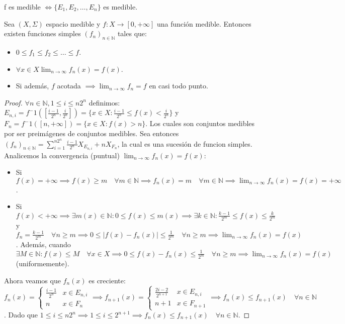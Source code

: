\begin{observación}
    f es medible $\iff \{E_1, E_2, \dots, E_n\}$ es medible.
\end{observación}
\begin{teorema}
    Sea $(X, \Sigma)$ espacio medible y $f: X \to [0, +\infty]$ una función medible. Entonces existen funciones simples $(f_n)_{n \in \mathbb{N}}$ tales que:
    \begin{itemize}
        \item $0 \leq f_1 \leq f_2 \leq \dots \leq f$.
        \item $\forall x \in X \lim_{n \to \infty}f_n(x) = f(x)$.
        \item Si además, $f$ acotada $\implies \lim_{n \to \infty}f_n = f$ en casi todo punto.
    \end{itemize} 
\end{teorema}
\begin{proof}
    $\forall n \in \mathbb{N}, 1 \leq i \leq n2^n$ definimos: 
    $E_{n, i} = f^-1([\frac{i-1}{2^n}, \frac{i}{2^n}]) = \{x \in X : \frac{i-1}{2^n} \leq f(x) < \frac{i}{2^n}\}$ y $F_n = f^-1([n, +\infty]) = \{x \in X : f(x) > n\}$.
    Los cuales son conjuntos medibles por ser preimágenes de conjuntos medibles. Sea entonces $(f_n)_{n\in\mathbb{N}} = \sum_{i = 1}^{n2^n}\frac{i-1}{2^n}X_{E_{n, i}} + nX_{F_n}$, la cual es una sucesión de funcion simples. 
    Analicemos la convergencia (puntual) $\lim_{n \to \infty}f_n(x) = f(x)$: 
    \begin{itemize}
        \item Si $f(x) = +\infty \implies f(x) \geq m \quad \forall m \in \mathbb{N} \implies f_n(x) = m \quad \forall m \in \mathbb{N} \implies \lim_{n \to \infty}f_n(x) = f(x) = +\infty$.
        \item Si $f(x) < +\infty \implies \exists m(x) \in \mathbb{N} : 0 \leq f(x) \leq m(x) \implies \exists k \in \mathbb{N} : \frac{k-1}{2^m} \leq f(x) \leq \frac{k}{2^m}$ y $f_n = \frac{k-1}{2^m} \quad \forall n \geq m \implies 0 \leq |f(x) - f_n(x)| \leq \frac{1}{2^m} \quad \forall n \geq m \implies \lim_{n \to \infty}f_n(x) = f(x)$. Además, cuando $\exists M \in \mathbb{N} : f(x) \leq M \quad \forall x \in X \implies 0 \leq f(x) - f_n(x) \leq \frac{1}{2^m} \quad \forall n \geq m \implies \lim_{n \to \infty}f_n(x) = f(x)$ (uniformemente).
    \end{itemize}
    Ahora veamos que $f_n(x)$ es creciente:
    $f_n(x) = \begin{cases}
        \frac{i-1}{2^n} & x \in E_{n, i} \\
        n & x \in F_n
    \end{cases}
    \implies f_{n+1}(x) = \begin{cases}
        \frac{2i-2}{2^{n+1}} & x \in E_{n, i} \\
        n+1 & x \in F_{n+1}
    \end{cases}
    \implies f_n(x) \leq f_{n+1}(x) \quad \forall n \in \mathbb{N}$. Dado que $1 \leq i \leq n2^n \implies 1 \leq i \leq 2^{n+1} \implies f_n(x) \leq f_{n+1}(x) \quad \forall n \in \mathbb{N}$.
\end{proof} 
